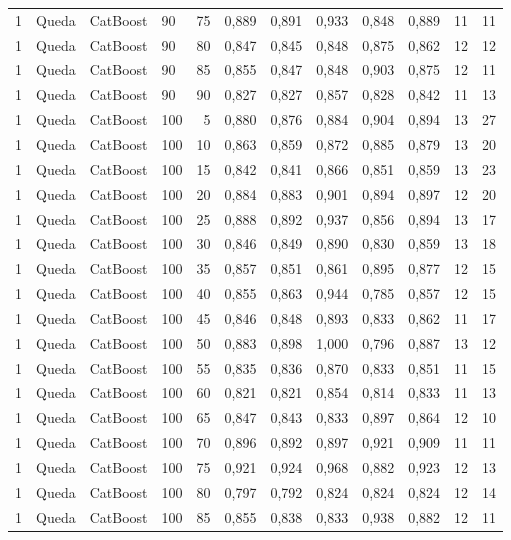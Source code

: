 \begin{longtable}{ccclrrrrrrrr}
1 & Queda & CatBoost & 90 & 75 & 0,889 & 0,891 & 0,933 & 0,848 & 0,889 & 11 & 11 \\
1 & Queda & CatBoost & 90 & 80 & 0,847 & 0,845 & 0,848 & 0,875 & 0,862 & 12 & 12 \\
1 & Queda & CatBoost & 90 & 85 & 0,855 & 0,847 & 0,848 & 0,903 & 0,875 & 12 & 11 \\
1 & Queda & CatBoost & 90 & 90 & 0,827 & 0,827 & 0,857 & 0,828 & 0,842 & 11 & 13 \\
1 & Queda & CatBoost & 100 & 5 & 0,880 & 0,876 & 0,884 & 0,904 & 0,894 & 13 & 27 \\
1 & Queda & CatBoost & 100 & 10 & 0,863 & 0,859 & 0,872 & 0,885 & 0,879 & 13 & 20 \\
1 & Queda & CatBoost & 100 & 15 & 0,842 & 0,841 & 0,866 & 0,851 & 0,859 & 13 & 23 \\
1 & Queda & CatBoost & 100 & 20 & 0,884 & 0,883 & 0,901 & 0,894 & 0,897 & 12 & 20 \\
1 & Queda & CatBoost & 100 & 25 & 0,888 & 0,892 & 0,937 & 0,856 & 0,894 & 13 & 17 \\
1 & Queda & CatBoost & 100 & 30 & 0,846 & 0,849 & 0,890 & 0,830 & 0,859 & 13 & 18 \\
1 & Queda & CatBoost & 100 & 35 & 0,857 & 0,851 & 0,861 & 0,895 & 0,877 & 12 & 15 \\
1 & Queda & CatBoost & 100 & 40 & 0,855 & 0,863 & 0,944 & 0,785 & 0,857 & 12 & 15 \\
1 & Queda & CatBoost & 100 & 45 & 0,846 & 0,848 & 0,893 & 0,833 & 0,862 & 11 & 17 \\
1 & Queda & CatBoost & 100 & 50 & 0,883 & 0,898 & 1,000 & 0,796 & 0,887 & 13 & 12 \\
1 & Queda & CatBoost & 100 & 55 & 0,835 & 0,836 & 0,870 & 0,833 & 0,851 & 11 & 15 \\
1 & Queda & CatBoost & 100 & 60 & 0,821 & 0,821 & 0,854 & 0,814 & 0,833 & 11 & 13 \\
1 & Queda & CatBoost & 100 & 65 & 0,847 & 0,843 & 0,833 & 0,897 & 0,864 & 12 & 10 \\
1 & Queda & CatBoost & 100 & 70 & 0,896 & 0,892 & 0,897 & 0,921 & 0,909 & 11 & 11 \\
1 & Queda & CatBoost & 100 & 75 & 0,921 & 0,924 & 0,968 & 0,882 & 0,923 & 12 & 13 \\
1 & Queda & CatBoost & 100 & 80 & 0,797 & 0,792 & 0,824 & 0,824 & 0,824 & 12 & 14 \\
1 & Queda & CatBoost & 100 & 85 & 0,855 & 0,838 & 0,833 & 0,938 & 0,882 & 12 & 11 \\

\end{longtable}
